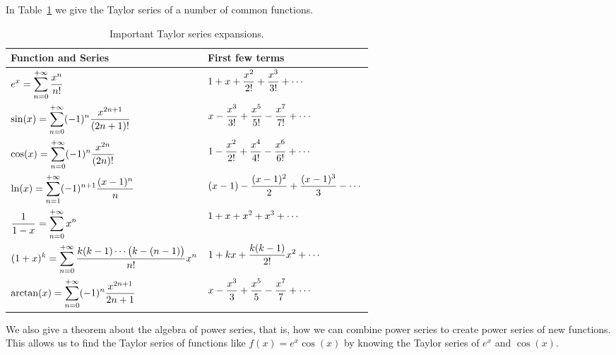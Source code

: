 In Table~\ref{idea:common_taylor} we give  the Taylor series of a number of common functions. 

\begin{table}
\caption{Important Taylor series expansions.}
\label{idea:common_taylor}
\begin{tabular}{l|l}
Function and Series & First few terms  \\\hline
\rule{0pt}{25pt}$\displaystyle e^x = \sum_{n=0}^{+\infty} \frac{x^n}{n!}$ & $\displaystyle 1+ x+\frac{x^2}{2!} + \frac{x^3}{3!}+\cdots$ \\
\rule{0pt}{25pt}$\displaystyle \sin(x) = \sum_{n=0}^{+\infty} (-1)^n\frac{x^{2n+1}}{(2n+1)!}$ & $\displaystyle x-\frac{x^3}{3!}+\frac{x^5}{5!} - \frac{x^7}{7!}+\cdots$ \\
\rule{0pt}{25pt}$\displaystyle \cos(x) = \sum_{n=0}^{+\infty} (-1)^n\frac{x^{2n}}{(2n)!}$ & $\displaystyle 1-\frac{x^2}{2!}+\frac{x^4}{4!} - \frac{x^6}{6!} +\cdots$ \\
\rule{0pt}{25pt}$\displaystyle \ln(x) = \sum_{n=1}^{+\infty}(-1)^{n+1}\frac{(x-1)^n}{n}$ & $\displaystyle (x-1)- \frac{(x-1)^2}{2} +\frac{(x-1)^3}{3}-\cdots$\\
\rule{0pt}{25pt}$\displaystyle \frac{1}{1-x} = \sum_{n=0}^{+\infty} x^n$ &$\displaystyle 1+x+x^2+x^3+\cdots$\\
\rule{0pt}{25pt}$\displaystyle (1+x)^k=\sum_{n=0}^{+\infty} \frac{k(k-1)\cdots\big(k-(n-1)\big)}{n!}x^n$ & $\displaystyle 1+kx+\frac{k(k-1)}{2!}x^2 + \cdots$\\
\rule{0pt}{25pt}$\displaystyle \arctan(x) = \sum_{n=0}^{+\infty} (-1)^n\frac{x^{2n+1}}{2n+1}$ & $\displaystyle x-\frac{x^3}{3}+\frac{x^5}{5}-\frac{x^7}{7}+\cdots$ \\
\end{tabular}
\end{table}

We also give a theorem about the algebra of power series, that is, how we can combine power series to create power series of new functions. This allows us to find the Taylor series of functions like $f(x) = e^x\cos (x)$ by knowing the Taylor series of $e^x$ and $\cos (x)$.

